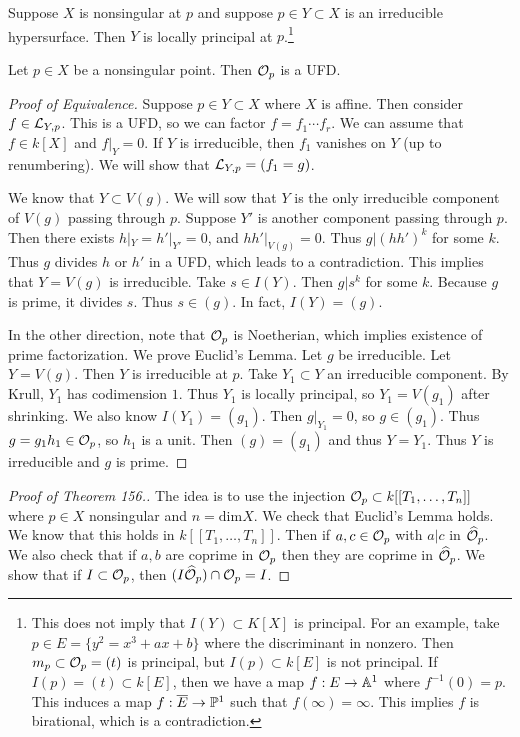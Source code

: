 \documentclass[twoside, 10pt]{article}
\begin{document}
    \begin{thm}
        Suppose $X$ is nonsingular at $p$ and suppose $p \in Y \subset X$ is an irreducible hypersurface. Then $Y$ is locally principal at $p$.\footnote{This does not imply that $I(Y) \subset K[X]$ is principal. For an example, take $p \in E = \{y^2 = x^3+ax+b\}$ where the discriminant in nonzero. Then $m_p \subset \mc{O}_p = (t)$ is principal, but $I(p) \subset k[E]$ is not principal. If $I(p) = (t) \subset k[E]$, then we have a map $f:E \to \A^1$ where $f^{-1}(0) = p$. This induces a map $f:\overline{E} \to \P^1$ such that $f(\infty) = \infty$. This implies $f$ is birational, which is a contradiction.}
    \end{thm}

    \begin{thm}
        Let $p \in X$ be a nonsingular point. Then $\mc{O}_p$ is a UFD.
        \begin{proof}[Proof of Equivalence]
            Suppose $p \in Y \subset X$ where $X$ is affine. Then consider $f \in \mc{L}_{Y,p}$. This is a UFD, so we can factor $f = f_1 \cdots f_r$. We can assume that $f \in k[X]$ and $f|_Y = 0$. If $Y$ is irreducible, then $f_1$ vanishes on $Y$ (up to renumbering). We will show that $\mc{L}_{Y,p} = (f_1=g)$.
            
            We know that $Y \subset V(g)$. We will sow that $Y$ is the only irreducible component of $V(g)$ passing through $p$. Suppose $Y'$ is another component passing through $p$. Then there exists $h|_Y = h'|_{Y'} = 0$, and $hh'|_{V(g)} = 0$. Thus $g | (hh')^k$ for some $k$. Thus $g$ divides $h$ or $h'$ in a UFD, which leads to a contradiction. This implies that $Y = V(g)$ is irreducible. Take $s \in I(Y)$. Then $g|s^k$ for some $k$. Because $g$ is prime, it divides $s$. Thus $s \in (g)$. In fact, $I(Y) = (g)$.

            In the other direction, note that $\mc{O}_p$ is Noetherian, which implies existence of prime factorization. We prove Euclid's Lemma. Let $g$ be irreducible. Let $Y = V(g)$. Then $Y$ is irreducible at $p$. Take $Y_1 \subset Y$ an irreducible component. By Krull, $Y_1$ has codimension $1$. Thus $Y_1$ is locally principal, so $Y_1 = V(g_1)$ after shrinking. We also know $I(Y_1) = (g_1)$. Then $g|_{Y_1} = 0$, so $g \in (g_1)$. Thus $g = g_1h_1 \in \mc{O}_p$, so $h_1$ is a unit. Then $(g) = (g_1)$ and thus $Y = Y_1$. Thus $Y$ is irreducible and $g$ is prime.
        \end{proof}

        \begin{proof}[Proof of Theorem 156.]
            The idea is to use the injection $\mc{O}_p \subset k[[T_1, \ldots, T_n]]$ where $p \in X$ nonsingular and $n = \mathrm{dim} X$. We check that Euclid's Lemma holds. We know that this holds in $k[[T_1, \ldots, T_n]]$. Then if $a,c \in \mc{O}_p$ with $a|c$ in $\widehat{\mc{O}}_p$. We also check that if $a,b$ are coprime in $\mc{O}_p$ then they are coprime in $\widehat{\mc{O}}_p$. We show that if $I \subset \mc{O}_p$, then $(I\widehat{\mc{O}}_p) \cap \mc{O}_p = I$.


\end{proof}
\end{thm}
\end{document}
